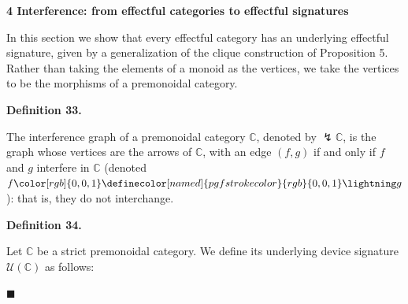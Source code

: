 \documentclass[10pt,a4paper]{article}
\begin{document}
 
 
 
 


 
\par\medskip\noindent\textbf{4 Interference: from effectful categories to effectful signatures}\par
 
 
In this section we show that every effectful category has an underlying effectful signature, given by a generalization of the clique construction of Proposition 5. Rather than taking the elements of a monoid as the vertices, we take the vertices to be the morphisms of a premonoidal category.\par
 
 
 
\par\medskip\noindent\textbf{Definition 33.}\par
 
 
The interference graph of a premonoidal category $\mathbb{C}$, denoted by ${\lightning}\mathbb{C}$, is the graph whose vertices are the arrows of $\mathbb{C}$, with an edge $(f,g)$ if and only if $f$ and $g$ interfere in $\mathbb{C}$ (denoted $f{\color[rgb]{0,0,1}\definecolor[named]{pgfstrokecolor}{rgb}{0,0,1}\lightning}g$): that is, they do not interchange.\par
 
 
 
 
\par\medskip\noindent\textbf{Definition 34.}\par
 
 
Let $\mathbb{C}$ be a strict premonoidal category. We define its underlying device signature $\mathcal{U}(\mathbb{C})$ as follows:\par
  
\par\noindent  $\blacksquare$ 
 
\end{document}
